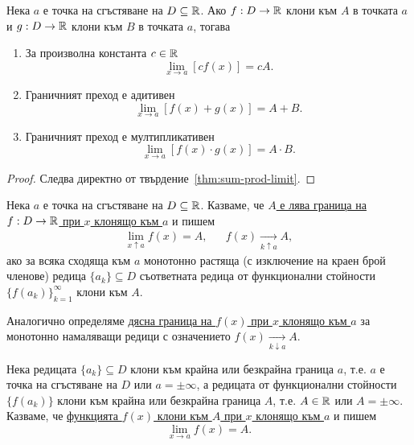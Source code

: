 \documentclass[numbers=endperiod, DIV=15, bibliography=totocnumbered]{scrartcl}
\begin{document}
\begin{proposition}\label{thm:limit-linear-mult}
  Нека $a$ е точка на сгъстяване на $D \subseteq \mathbb{R}$. Ако $f: D \to \mathbb{R}$ клони към $A$ в точката $a$ и $g: D \to \mathbb{R}$ клони към $B$ в точката $a$, тогава
  \begin{enumerate}
    \item За произволна константа $c \in \mathbb{R}$
    \begin{displaymath}
      \lim_{x \to a} [c f(x)] = c A.
    \end{displaymath}

    \item Граничният преход е адитивен
    \begin{displaymath}
      \lim_{x \to a} [f(x) + g(x)] = A + B.
    \end{displaymath}

    \item Граничният преход е мултипликативен
    \begin{displaymath}
      \lim_{x \to a} [f(x) \cdot g(x)] = A \cdot B.
    \end{displaymath}
  \end{enumerate}
\end{proposition}
\begin{proof}
  Следва директно от твърдение~\ref{thm:sum-prod-limit}.
\end{proof}

\begin{definition}
  Нека $a$ е точка на сгъстяване на $D \subseteq \mathbb{R}$. Казваме, че \uline{$A$ е лява граница на $f: D \to \mathbb{R}$ при $x$ клонящо към $a$} и пишем
  \begin{align*}
    \lim_{x \uparrow a} f(x) = A,
    &&
    f(x) \underset {k \uparrow a} \longrightarrow A,
  \end{align*}
  ако за всяка сходяща към $a$ монотонно растяща (с изключение на краен брой членове) редица $\{ a_k \} \subseteq D$ съответната редица от функционални стойности ${\{ f(a_k) \}}_{k=1}^\infty$ клони към $A$.

  Аналогично определяме \uline{дясна граница на $f(x)$ при $x$ клонящо към $a$} за монотонно намаляващи редици с означението $f(x) \underset {k \downarrow a} \longrightarrow A$.
\end{definition}

\begin{definition}
  Нека редицата $\{ a_k \} \subseteq D$ клони към крайна или безкрайна граница $a$, т.е. $a$ е точка на сгъстяване на $D$ или $a = \pm \infty$, а редицата от функционални стойности $\{ f(a_k) \}$ клони към крайна или безкрайна граница $A$, т.е. $A \in \mathbb{R}$ или $A = \pm \infty$. Казваме, че \uline{функцията $f(x)$ клони към $A$ при $x$ клонящо към $a$} и пишем
  \begin{displaymath}
    \lim_{x \to a} f(x) = A.
  \end{displaymath}
\end{definition}
\end{document}
